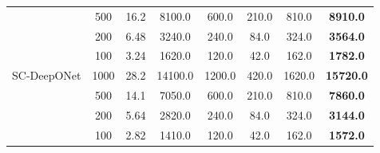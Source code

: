 \begin{table}[htbp]
\begin{tabular}{l|c|cc|ccc|c}
       & 500  & 16.2 & 8100.0  & 600.0  & 210.0 & 810.0  & \textbf{8910.0} \\
       & 200  & 6.48 & 3240.0  & 240.0  & 84.0  & 324.0  & \textbf{3564.0} \\
       & 100  & 3.24 & 1620.0  & 120.0  & 42.0  & 162.0  & \textbf{1782.0} \\
\hline
SC-DeepONet & 1000 & 28.2 & 14100.0 & 1200.0 & 420.0 & 1620.0 & \textbf{15720.0} \\
            & 500  & 14.1 & 7050.0  & 600.0  & 210.0 & 810.0  & \textbf{7860.0} \\
            & 200  & 5.64 & 2820.0  & 240.0  & 84.0  & 324.0  & \textbf{3144.0} \\
            & 100  & 2.82 & 1410.0  & 120.0  & 42.0  & 162.0  & \textbf{1572.0} \\
\hline
\end{tabular}
\end{table}



